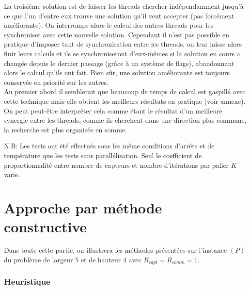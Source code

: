 \documentclass[12pt,a4paper]{article}
\begin{document}
La troisième solution est de laisser les threads chercher indépendamment jusqu'à ce que l'un d'entre eux trouve une solution qu'il veut accepter (pas forcément améliorante). On interromps alors le calcul des autres threads pour les synchroniser avec cette nouvelle solution. Cependant il n'est pas possible en pratique d'imposer tant de synchronisation entre les threads, on leur laisse alors finir leurs calculs et ils se synchroniseront d'eux-mêmes si la solution en cours a changée depuis le dernier passage (grâce à un système de flags), abandonnant alors le calcul qu'ils ont fait. Bien sûr, une solution améliorante est toujours conservée en priorité sur les autres.
\\Au premier abord il semblerait que beaucoup de temps de calcul est gaspillé avec cette technique mais elle obtient les meilleurs résultats en pratique (voir annexe). On peut peut-être interpréter cela comme étant le  résultat d'un meilleure synergie entre les threads, comme ils cherchent dans une direction plus commune, la recherche est plus organisée en somme.

N.B: Les tests ont été effectués sous les même conditions d'arrêts et de température que les tests sans parallélisation. Seul le coefficient de proportionnalité entre nombre de capteurs et nombre d'itérations par palier $K$ varie. 

\part{Approche par méthode constructive}
Dans toute cette partie, on illustrera les méthodes présentées sur l'instance $(P)$ du problème de largeur $5$ et de hauteur $4$ avec $R_{capt}=R_{comm}=1$.
\section{Heuristique}
\end{document}
